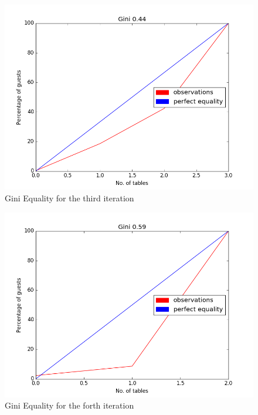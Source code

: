 \documentclass{WeSTassignment}
\begin{document}
\begin{figure}[h]
  \centering
  \includegraphics[scale = 0.5]{gini3.png}
   \caption{Gini Equality for the third iteration}
     \label{fig:dig} 
\end{figure}

\begin{figure}[h]
  \centering
  \includegraphics[scale = 0.5]{gini4.png}
   \caption{Gini Equality for the forth iteration}
     \label{fig:dig} 
\end{figure}
\end{document}
